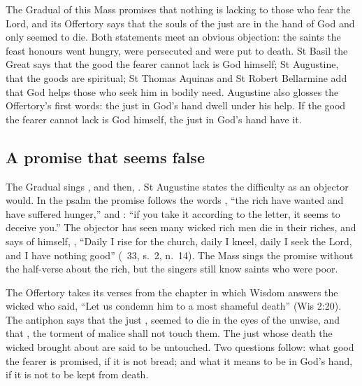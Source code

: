 
The Gradual of this Mass promises that nothing is lacking to those who fear
the Lord, and its Offertory says that the souls of the just are in the hand of
God and only seemed to die. Both statements meet an obvious objection: the
saints the feast honours went hungry, were persecuted and were put to death.
St Basil the Great says that the good the fearer cannot lack is God himself;
St Augustine, that the goods are spiritual; St Thomas Aquinas and St Robert
Bellarmine add that God helps those who seek him in bodily need. Augustine
also glosses the Offertory's first words: the just in God's hand dwell under
his help. If the good the fearer cannot lack is God himself, the just in God's
hand have it.

\subsection{A promise that seems false}
\label{sec:no-want-question}

The Gradual sings , and then, . St Augustine states the difficulty as an objector would.
In the psalm the promise follows the words , ``the rich have wanted and have suffered hunger,'' and
: ``if you take it according
to the letter, it seems to deceive you.'' The objector has seen many wicked rich
men die in their riches, and says of himself, ,
``Daily I rise for the church, daily I kneel, daily I seek the Lord, and I have
nothing good'' (\ 33, s.~2, n.~14). The Mass sings the
promise without the half-verse about the rich, but the singers still know
saints who were poor.

The Offertory takes its verses from the chapter in which Wisdom answers the
wicked who said, ``Let us condemn him to a most shameful death'' (Wis 2:20).
The antiphon says that the just ,
seemed to die in the eyes of the unwise, and that , the torment of malice shall not touch them. The just
whose death the wicked brought about are said to be untouched. Two questions
follow: what good the fearer is promised, if it is not bread; and what it means
to be in God's hand, if it is not to be kept from death.

